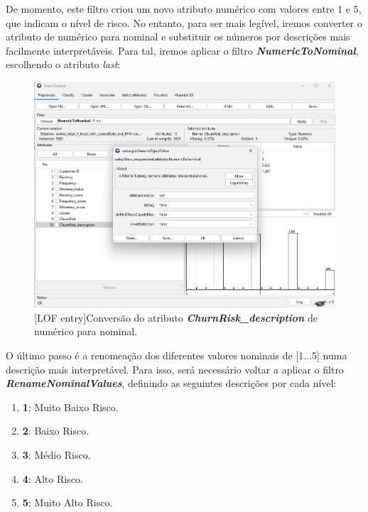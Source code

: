 \documentclass{easychair}
\begin{document}
De momento, este filtro criou um novo atributo numérico com valores entre 1 e 5, que indicam o nível de risco. No entanto, para ser mais legível, iremos converter o atributo de numérico para nominal e substituir os números por descrições mais facilmente interpretáveis. Para tal, iremos aplicar o filtro \textit{\textbf{NumericToNominal}}, escolhendo o atributo \textit{last}:

\begin{figure}[H]
    \begin{centering}
    \includegraphics[width=1\linewidth]{imagens/figure22.jpg}\label{cap-3-fig22}
    [LOF entry]{Conversão do atributo \textit{\textbf{ChurnRisk_description}} de numérico para nominal.}
    \label{fig22}
    \end{centering}
\end{figure}

O último passo é a renomeação dos diferentes valores nominais de [1...5] numa descrição mais interpretável. Para isso, será necessário voltar a aplicar o filtro \textit{\textbf{RenameNominalValues}}, definindo as seguintes descrições por cada nível:

\begin{enumerate}
	\item[\textbullet] \textbf{1}: Muito Baixo Risco.
	\item[\textbullet] \textbf{2}: Baixo Risco.
	\item[\textbullet] \textbf{3}: Médio Risco.
	\item[\textbullet] \textbf{4}: Alto Risco.
	\item[\textbullet] \textbf{5}: Muito Alto Risco.
\end{enumerate}
\end{document}
